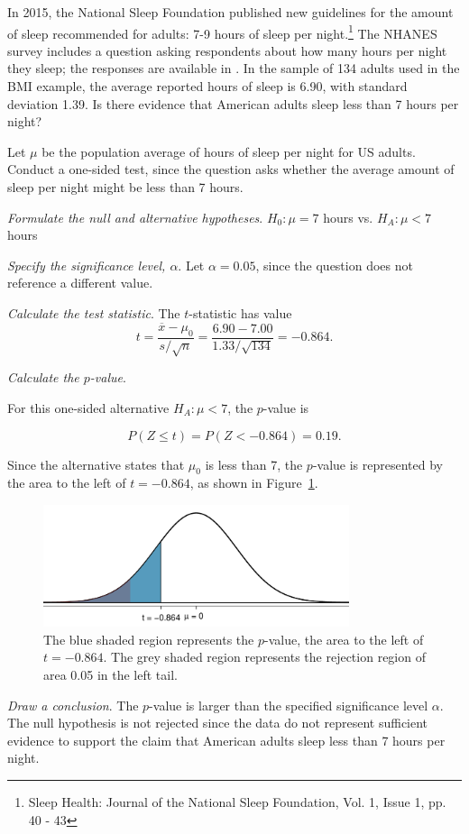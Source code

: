
\begin{example}
{In 2015, the National Sleep Foundation published new guidelines for the amount of sleep recommended for adults: 7-9 hours of sleep per night.\footnote{Sleep Health: Journal of the National Sleep Foundation, Vol. 1, Issue 1, pp. 40 - 43} The NHANES survey includes a question asking respondents about how many hours per night they sleep; the responses are available in . In the sample of 134 adults used in the BMI example, the average reported hours of sleep is 6.90, with standard deviation 1.39. Is there evidence that American adults sleep less than 7 hours per night?}

Let $\mu$ be the population average of hours of sleep per night for US adults. Conduct a one-sided test, since the question asks whether the average amount of sleep per night might be less than 7 hours. 

\textit{Formulate the null and alternative hypotheses}. $H_0: \mu = 7$ hours vs. $H_A: \mu < 7$ hours

\textit{Specify the significance level, $\alpha$}.  Let $\alpha = 0.05$, since the question does not reference a different value. 

\textit{Calculate the test statistic}. The $t$-statistic has value
\[t = \frac{\overline{x}-\mu_0}{s/\sqrt{n}} = \frac{6.90 - 7.00} {1.33/\sqrt{134}} = -0.864.\]

\textit{Calculate the $p$-value}.

For this one-sided alternative $H_A: \mu < 7$, the $p$-value is 

\[P(Z \leq t) = P(Z < -0.864) = 0.19.\]

Since the alternative states that $\mu_0$ is less than 7, the $p$-value is represented by the area to the left of $t = -0.864$, as shown in Figure~\ref{pValueSleep}.


\begin{figure}[h]
	\centering
	\includegraphics[width=0.8\textwidth]{ch_inference_foundations_oi_biostat/figures/pValueSleep/pValueSleep}
	\caption{The blue shaded region represents the $p$-value, the area to the left of $t = -0.864$. The grey shaded region represents the rejection region of area 0.05 in the left tail.}
	\label{pValueSleep}
\end{figure}

\textit{Draw a conclusion}.  The $p$-value is larger than the specified significance level $\alpha$. The null hypothesis is not rejected since the data do not represent sufficient evidence to support the claim that American adults sleep less than 7 hours per night.

\end{example}

